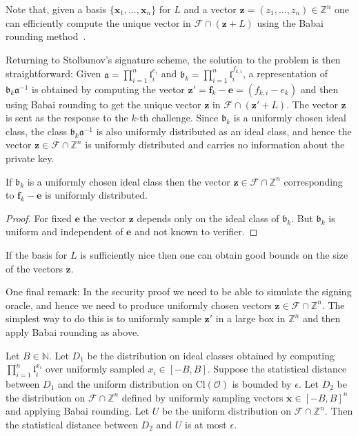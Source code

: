 \documentclass{llncs}
\newcommand{\FF}{\mathcal{F}}
\newcommand{\N}{\mathbb{N}}
\newcommand{\OO}{\mathcal{O}}
\newcommand{\Z}{\mathbb{Z}}
\newcommand{\Cl}{\text{Cl}}
\renewcommand{\a}{\mathfrak{a}}
\renewcommand{\b}{\mathfrak{b}}
\renewcommand{\l}{\mathfrak{l}}
\newcommand{\e}{\textbf{e}}
\newcommand{\f}{\textbf{f}}
\newcommand{\x}{\textbf{x}}
\newcommand{\z}{\textbf{z}}
\begin{document}
Note that, given a basis $\{ \x_1, \dots, \x_n \}$ for $L$ and a vector $\z = (z_1, \dots, z_n ) \in \Z^n$ one can efficiently compute the unique vector in $\FF \cap (\z + L )$ using the Babai rounding method~\cite{Bab86}.



Returning to Stolbunov's signature scheme, the solution to the problem is then straightforward:
Given $\a = \prod_{i=1}^n \l_i^{e_i}$ and $\b_k = \prod_{i=1}^n \l_i^{f_{k,i}}$,
a representation of $\b_k \a^{-1}$ is obtained by computing the vector $\z' = \f_k - \e = (f_{k,i} - e_k)$
and then using Babai rounding to get the unique vector $\z$ in $\FF \cap (\z' + L )$.
The vector $\z$ is sent as the response to the $k$-th challenge.
Since $\b_k$ is a uniformly chosen ideal class, the class $\b_k \a^{-1}$ is also uniformly distributed as an ideal class, and hence the vector $\z \in \FF \cap \Z^n$ is uniformly distributed and carries no information about the private key.

\begin{lemma}
If $\b_k$ is a uniformly chosen ideal class then the vector 
$\z \in \FF \cap \Z^n$ corresponding to $\f_k - \e$ is uniformly distributed.
\end{lemma}

\begin{proof}
For fixed $\e$ the vector $\z$ depends only on the ideal class of $\b_k$.
But $\b_k$ is uniform and independent of $\e$ and not known to verifier.
\end{proof}



If the basis for $L$ is sufficiently nice then one can obtain good bounds on the size of the vectors $\z$.

One final remark: In the security proof we need to be able to simulate the signing oracle, and hence we need to produce uniformly chosen vectors $\z \in \FF \cap \Z^n$.
The simplest way to do this is to uniformly sample $\z'$ in a large box in $\Z^n$ and then apply Babai rounding as above.


\begin{lemma} \label{lem:sim1}
Let $B \in \N$. Let $D_1$ be the distribution on ideal classes obtained by computing $\prod_{i=1}^n \l_i^{x_i}$ over uniformly sampled $x_i \in [-B,B]$.
Suppose the statistical distance between $D_1$ and the uniform distribution on $\Cl(\OO)$ is bounded by $\epsilon$.
Let $D_2$ be the distribution on $\FF \cap \Z^n$ defined by uniformly sampling vectors $\x \in [-B,B]^n$ and applying Babai rounding.
Let $U$ be the uniform distribution on $\FF \cap \Z^n$.
Then the statistical distance between $D_2$ and $U$ is at most $\epsilon$.
\end{lemma}
\end{document}

